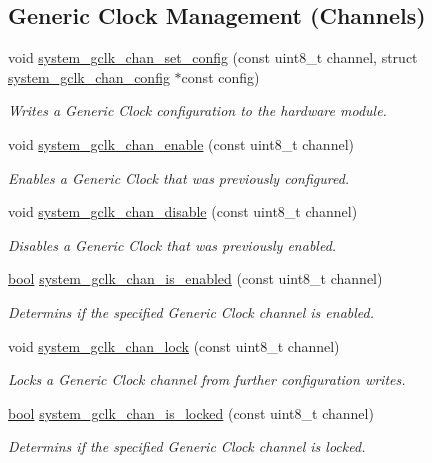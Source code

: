 \subsection*{Generic Clock Management (Channels)}
\begin{DoxyCompactItemize}
\item 
void \mbox{\hyperlink{group__asfdoc__sam0__system__clock__group_ga0dfbe40e700101f619ddc5b4eb83d78b}{system\+\_\+gclk\+\_\+chan\+\_\+set\+\_\+config}} (const uint8\+\_\+t channel, struct \mbox{\hyperlink{structsystem__gclk__chan__config}{system\+\_\+gclk\+\_\+chan\+\_\+config}} $\ast$const config)
\begin{DoxyCompactList}\small\item\em Writes a Generic Clock configuration to the hardware module. \end{DoxyCompactList}\item 
void \mbox{\hyperlink{group__asfdoc__sam0__system__clock__group_ga53e46ab144632c877a635ab70a7b51e1}{system\+\_\+gclk\+\_\+chan\+\_\+enable}} (const uint8\+\_\+t channel)
\begin{DoxyCompactList}\small\item\em Enables a Generic Clock that was previously configured. \end{DoxyCompactList}\item 
void \mbox{\hyperlink{group__asfdoc__sam0__system__clock__group_gaa1b945c9deba13fe8640563de4e11a53}{system\+\_\+gclk\+\_\+chan\+\_\+disable}} (const uint8\+\_\+t channel)
\begin{DoxyCompactList}\small\item\em Disables a Generic Clock that was previously enabled. \end{DoxyCompactList}\item 
\mbox{\hyperlink{group__group__sam0__utils_ga97a80ca1602ebf2303258971a2c938e2}{bool}} \mbox{\hyperlink{group__asfdoc__sam0__system__clock__group_ga2467f733c23f6ad18e58a4f60deae0bb}{system\+\_\+gclk\+\_\+chan\+\_\+is\+\_\+enabled}} (const uint8\+\_\+t channel)
\begin{DoxyCompactList}\small\item\em Determins if the specified Generic Clock channel is enabled. \end{DoxyCompactList}\item 
void \mbox{\hyperlink{group__asfdoc__sam0__system__clock__group_ga59856030d55e3e50091116ffe930a356}{system\+\_\+gclk\+\_\+chan\+\_\+lock}} (const uint8\+\_\+t channel)
\begin{DoxyCompactList}\small\item\em Locks a Generic Clock channel from further configuration writes. \end{DoxyCompactList}\item 
\mbox{\hyperlink{group__group__sam0__utils_ga97a80ca1602ebf2303258971a2c938e2}{bool}} \mbox{\hyperlink{group__asfdoc__sam0__system__clock__group_ga343a0b14dce2d7f2724382292ac1d8ef}{system\+\_\+gclk\+\_\+chan\+\_\+is\+\_\+locked}} (const uint8\+\_\+t channel)
\begin{DoxyCompactList}\small\item\em Determins if the specified Generic Clock channel is locked. \end{DoxyCompactList}\end{DoxyCompactItemize}

